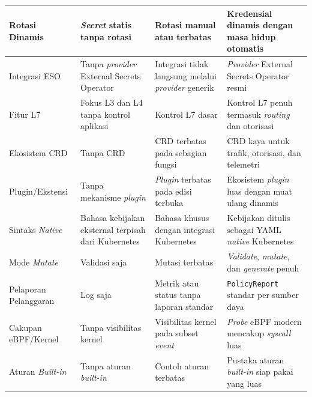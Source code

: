 {\begin{longtable}{|>{\raggedright\arraybackslash}m{2.6cm}|>{\raggedright\arraybackslash}m{3.4cm}|>{\raggedright\arraybackslash}m{3.5cm}|>{\raggedright\arraybackslash}m{3.5cm}|}
\hline
Rotasi Dinamis & \textit{Secret} statis tanpa rotasi & Rotasi manual atau terbatas & Kredensial dinamis dengan masa hidup otomatis \\
\hline
Integrasi ESO & Tanpa \textit{provider} External Secrets Operator & Integrasi tidak langsung melalui \textit{provider} generik & \textit{Provider} External Secrets Operator resmi \\
\hline
Fitur L7 & Fokus L3 dan L4 tanpa kontrol aplikasi & Kontrol L7 dasar & Kontrol L7 penuh termasuk \textit{routing} dan otorisasi \\
\hline
Ekosistem CRD & Tanpa CRD & CRD terbatas pada sebagian fungsi & CRD kaya untuk trafik, otorisasi, dan telemetri \\
\hline
Plugin/\allowbreak Ekstensi & Tanpa mekanisme \textit{plugin} & \textit{Plugin} terbatas pada edisi terbuka & Ekosistem \textit{plugin} luas dengan muat ulang dinamis \\
\hline
Sintaks \textit{Native} & Bahasa kebijakan eksternal terpisah dari Kubernetes & Bahasa khusus dengan integrasi Kubernetes & Kebijakan ditulis sebagai YAML \textit{native} Kubernetes \\
\hline
Mode \textit{Mutate} & Validasi saja & Mutasi terbatas & \textit{Validate}, \textit{mutate}, dan \textit{generate} penuh \\
\hline
Pela\-poran Pelang\-garan & Log saja & Metrik atau status tanpa laporan standar & \texttt{PolicyReport} standar per sumber daya \\
\hline
Cakupan eBPF/\allowbreak Kernel & Tanpa visibilitas kernel & Visibilitas kernel pada subset \textit{event} & \textit{Probe} eBPF modern mencakup \textit{syscall} luas \\
\hline
Aturan \textit{Built-in} & Tanpa aturan \textit{built-in} & Contoh aturan terbatas & Pustaka aturan \textit{built-in} siap pakai yang luas \\
\hline
\end{longtable}
}
